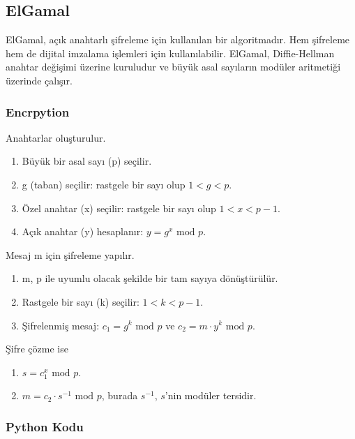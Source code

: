 \newpage

\subsection{ElGamal}

ElGamal, açık anahtarlı şifreleme için kullanılan bir algoritmadır. Hem şifreleme hem de dijital imzalama işlemleri için kullanılabilir. ElGamal, Diffie-Hellman anahtar değişimi üzerine kuruludur ve büyük asal sayıların modüler aritmetiği üzerinde çalışır. 

\subsubsection{Encrpytion}

Anahtarlar oluşturulur.

\begin{enumerate}
    \item Büyük bir asal sayı (p) seçilir.
    \item g (taban) seçilir: rastgele bir sayı olup $1 < g < p$.
    \item Özel anahtar (x) seçilir: rastgele bir sayı olup $1 < x < p - 1$.
    \item Açık anahtar (y) hesaplanır: $y = g^x \text{ mod } p$.
\end{enumerate}

Mesaj m için şifreleme yapılır.

\begin{enumerate}
    \item m, p ile uyumlu olacak şekilde bir tam sayıya dönüştürülür.
    \item Rastgele bir sayı (k) seçilir: $1 < k < p - 1$.
    \item Şifrelenmiş mesaj: $c_1 = g^k \text{ mod } p$ ve $c_2 = m \cdot y^k \text{ mod } p$.
\end{enumerate}

Şifre çözme ise

\begin{enumerate}
    \item $s = c_{1}^{x} \text{ mod } p$.
    \item $m = c_2 \cdot s^{-1} \text{ mod } p$, burada $s^{-1}$, $s$'nin modüler tersidir.
\end{enumerate}

\subsubsection{Python Kodu}

